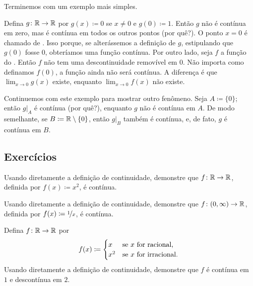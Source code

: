 Terminemos com um exemplo mais simples.

\begin{example} \label{example:removablediscont}
Defina
$g \colon {\mathbb{R}} \to {\mathbb{R}}$ por $g(x) \coloneqq 0$ se $x \neq 0$ e
$g(0) \coloneqq 1$. Então $g$ não é contínua em zero, mas é contínua em todos os outros pontos (por quê?).
O ponto $x=0$ é chamado de \emph{}. Isso
porque, se alterássemos a definição de $g$, estipulando que
$g(0)$ fosse $0$, obteríamos uma função contínua. Por outro lado,
seja $f$ a função do .
Então $f$ não tem uma
descontinuidade removível em $0$. Não importa como definamos $f(0)$, a função
ainda não será contínua. A diferença é que
$\lim_{x\to 0} g(x)$ existe, enquanto
$\lim_{x\to 0} f(x)$ não existe.

Continuemos com este exemplo para mostrar outro fenômeno.
Seja $A \coloneqq \{ 0 \}$; então $g|_A$ é contínua (por quê?), enquanto $g$ não é contínua em $A$.
De modo semelhante, se $B \coloneqq {\mathbb{R}} \setminus \{0 \}$, então $g|_B$ também é contínua,
e, de fato, $g$ é contínua em $B$.
\end{example}

\subsection{Exercícios}

\begin{exercise}
Usando diretamente a definição de continuidade, demonstre que
$f \colon {\mathbb{R}} \to {\mathbb{R}}$, definida por
$f(x) \coloneqq x^2$, é contínua.
\end{exercise}

\begin{exercise}
Usando diretamente a definição de continuidade, demonstre que
$f \colon (0,\infty) \to {\mathbb{R}}$, definida por
$f(x) \coloneqq \nicefrac{1}{x}$, é contínua.
\end{exercise}

\begin{exercise}
Defina $f \colon {\mathbb{R}} \to {\mathbb{R}}$ por
\begin{equation*}
f(x) \coloneqq
\begin{cases}
x & \text{se } x \text{ for racional,} \\
x^2 & \text{se } x \text{ for irracional.}
\end{cases}
\avoidbreak
\end{equation*}
Usando diretamente a definição de continuidade, demonstre que
$f$ é contínua em $1$ e descontínua em $2$.
\end{exercise}

